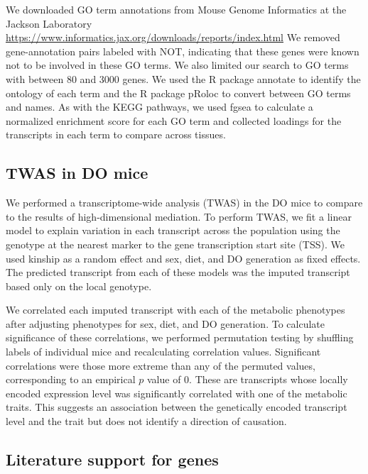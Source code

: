 \documentclass[
]{article}
\begin{document}
We downloaded GO term annotations from Mouse Genome Informatics at the
Jackson Laboratory \cite{pmid33231642}
\url{https://www.informatics.jax.org/downloads/reports/index.html} We
removed gene-annotation pairs labeled with NOT, indicating that these
genes were known not to be involved in these GO terms. We also limited
our search to GO terms with between 80 and 3000 genes. We used the R
package annotate \cite{R_annotate} to identify the ontology of each term
and the R package pRoloc \cite{pmid24413670} to convert between GO terms
and names. As with the KEGG pathways, we used fgsea to calculate a
normalized enrichment score for each GO term and collected loadings for
the transcripts in each term to compare across tissues.

\subsection{TWAS in DO mice}\label{twas-in-do-mice}

We performed a transcriptome-wide analysis (TWAS) \cite{pmid26258848, 
pmid26854917} in the DO mice to compare to the results of
high-dimensional mediation. To perform TWAS, we fit a linear model to
explain variation in each transcript across the population using the
genotype at the nearest marker to the gene transcription start site
(TSS). We used kinship as a random effect and sex, diet, and DO
generation as fixed effects. The predicted transcript from each of these
models was the imputed transcript based only on the local genotype.

We correlated each imputed transcript with each of the metabolic
phenotypes after adjusting phenotypes for sex, diet, and DO generation.
To calculate significance of these correlations, we performed
permutation testing by shuffling labels of individual mice and
recalculating correlation values. Significant correlations were those
more extreme than any of the permuted values, corresponding to an
empirical \(p\) value of 0. These are transcripts whose locally encoded
expression level was significantly correlated with one of the metabolic
traits. This suggests an association between the genetically encoded
transcript level and the trait but does not identify a direction of
causation.

\subsection{Literature support for
genes}\label{literature-support-for-genes}
\end{document}
